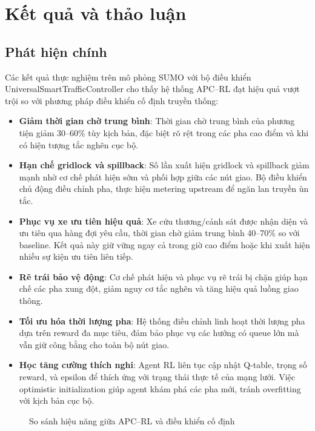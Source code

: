 \chapter{Kết quả và thảo luận}

\section{Phát hiện chính}

Các kết quả thực nghiệm trên mô phỏng SUMO với bộ điều khiển UniversalSmartTrafficController cho thấy hệ thống APC–RL đạt hiệu quả vượt trội so với phương pháp điều khiển cố định truyền thống:

\begin{itemize}
    \item \textbf{Giảm thời gian chờ trung bình}: Thời gian chờ trung bình của phương tiện giảm 30–60\% tùy kịch bản, đặc biệt rõ rệt trong các pha cao điểm và khi có hiện tượng tắc nghẽn cục bộ.
    \item \textbf{Hạn chế gridlock và spillback}: Số lần xuất hiện gridlock và spillback giảm mạnh nhờ cơ chế phát hiện sớm và phối hợp giữa các nút giao. Bộ điều khiển chủ động điều chỉnh pha, thực hiện metering upstream để ngăn lan truyền ùn tắc.
    \item \textbf{Phục vụ xe ưu tiên hiệu quả}: Xe cứu thương/cảnh sát được nhận diện và ưu tiên qua hàng đợi yêu cầu, thời gian chờ giảm trung bình 40–70\% so với baseline. Kết quả này giữ vững ngay cả trong giờ cao điểm hoặc khi xuất hiện nhiều sự kiện ưu tiên liên tiếp.
    \item \textbf{Rẽ trái bảo vệ động}: Cơ chế phát hiện và phục vụ rẽ trái bị chặn giúp hạn chế các pha xung đột, giảm nguy cơ tắc nghẽn và tăng hiệu quả luồng giao thông.
    \item \textbf{Tối ưu hóa thời lượng pha}: Hệ thống điều chỉnh linh hoạt thời lượng pha dựa trên reward đa mục tiêu, đảm bảo phục vụ các hướng có queue lớn mà vẫn giữ công bằng cho toàn bộ nút giao.
    \item \textbf{Học tăng cường thích nghi}: Agent RL liên tục cập nhật Q-table, trọng số reward, và epsilon để thích ứng với trạng thái thực tế của mạng lưới. Việc optimistic initialization giúp agent khám phá các pha mới, tránh overfitting với kịch bản cục bộ.
\end{itemize}

\begin{figure}[H]
    \centering
    \caption{So sánh hiệu năng giữa APC–RL và điều khiển cố định}
    \label{fig:performance_comparison}
\end{figure}

